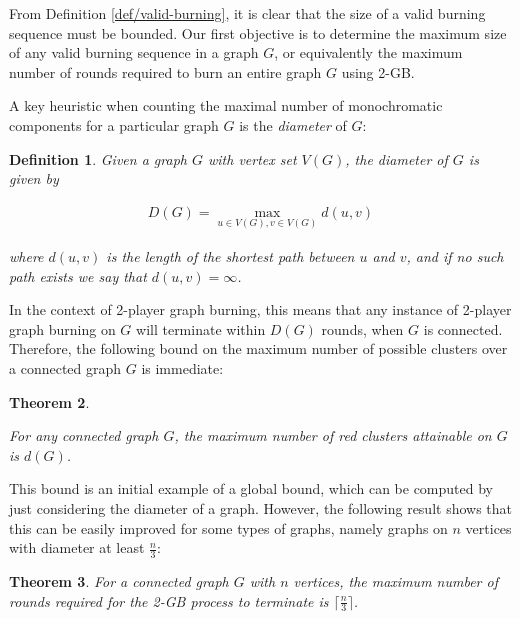 \documentclass{mpaper}
\newtheorem{theorem}{Theorem}[section]
\newtheorem{definition}[theorem]{Definition}
\begin{document}
From Definition \ref{def/valid-burning}, it is clear that the size of a valid burning sequence must be bounded. Our first objective is to determine the maximum size of any valid burning sequence in a graph $G$, or equivalently the maximum number of rounds required to burn an entire graph $G$ using 2-GB.

A key heuristic when counting the maximal number of monochromatic components for a particular graph $G$ is the \emph{diameter} of $G$:

\begin{definition}
\label{def/diameter}
  Given a graph $G$ with vertex set $V(G)$, the \emph{diameter} of $G$ is given by
  
  \begin{align*}
  D(G) = \max_{u \in V(G), v \in V(G)} d(u,v)
  \end{align*}

  where $d(u,v)$ is the length of the shortest path between $u$ and $v$, and if no such path exists we say that $d(u,v) = \infty$.
\end{definition}

In the context of 2-player graph burning, this means that any instance of 2-player graph burning on $G$ will terminate within $D(G)$ rounds, when $G$ is connected. Therefore, the following bound on the maximum number of possible clusters over a connected graph $G$ is immediate:

\begin{theorem}
\label{def/diameter_bound}

For any connected graph $G$, the maximum number of red clusters attainable on $G$ is $d(G)$.

\end{theorem}

This bound is an initial example of a global bound, which can be computed by just considering the diameter of a graph. However, the following result shows that this can be easily improved for some types of graphs, namely graphs on $n$ vertices with diameter at least $\frac{n}{3}$:

\begin{theorem}
  \label{thm/connected-bound}
  For a connected graph $G$ with $n$ vertices, the maximum number of rounds required for the 2-GB process to terminate is $\lceil \frac{n}{3} \rceil$.
\end{theorem}
\end{document}
